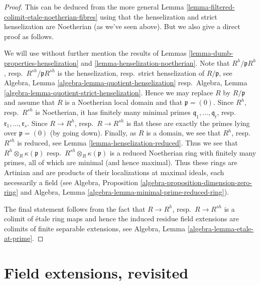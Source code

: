 \begin{proof}
This can be deduced from the more general
Lemma \ref{lemma-filtered-colimit-etale-noetherian-fibres}
using that the henselization and strict henselization are Noetherian
(as we've seen above). But we also give a direct proof as follows.

\medskip\noindent
We will use without further mention the results of
Lemmas \ref{lemma-dumb-properties-henselization} and
\ref{lemma-henselization-noetherian}.
Note that $R^h/\mathfrak pR^h$, resp.\ $R^{sh}/\mathfrak pR^{sh}$
is the henselization, resp.\ strict henselization of $R/\mathfrak p$,
see Algebra, Lemma \ref{algebra-lemma-quotient-henselization}
resp.\ Algebra, Lemma \ref{algebra-lemma-quotient-strict-henselization}.
Hence we may replace $R$ by $R/\mathfrak p$ and assume that $R$
is a Noetherian local domain and that $\mathfrak p = (0)$.
Since $R^h$, resp.\ $R^{sh}$ is Noetherian, it has finitely many
minimal primes $\mathfrak q_1, \ldots, \mathfrak q_t$,
resp.\ $\mathfrak r_1, \ldots, \mathfrak r_s$.
Since $R \to R^h$, resp.\ $R \to R^{sh}$ is flat these are exactly
the primes lying over $\mathfrak p = (0)$ (by going down).
Finally, as $R$ is a domain, we see that $R^h$, resp.\ $R^{sh}$
is reduced, see Lemma \ref{lemma-henselization-reduced}.
Thus we see that $R^h \otimes_R \kappa(\mathfrak p)$
resp.\ $R^{sh} \otimes_R \kappa(\mathfrak p)$
is a reduced Noetherian ring with finitely many primes, all of which
are minimal (and hence maximal). Thus these rings are Artinian and are
products of their localizations at maximal ideals, each necessarily a field
(see Algebra, Proposition \ref{algebra-proposition-dimension-zero-ring} and
Algebra, Lemma \ref{algebra-lemma-minimal-prime-reduced-ring}).

\medskip\noindent
The final statement follows from the fact that $R \to R^h$,
resp.\ $R \to R^{sh}$ is a colimit of \'etale ring maps and hence
the induced residue field extensions are colimits of finite separable
extensions, see
Algebra, Lemma \ref{algebra-lemma-etale-at-prime}.
\end{proof}









\section{Field extensions, revisited}
\label{section-p-bases}

